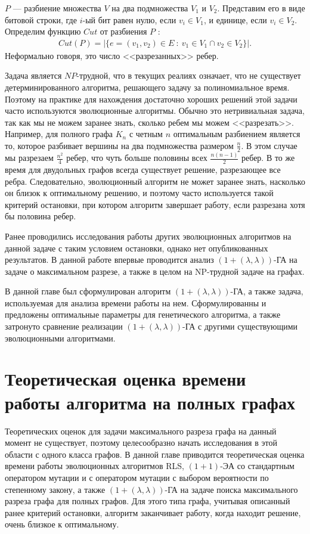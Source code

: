 \documentclass[times]{itmo-student-thesis}
\newcommand{\alglambdaf}{${(1 + (\lambda , \lambda))}$-ГА\xspace}
\newcommand{\oea}{\mbox{$(1 + 1)$-ЭА}\xspace}
\begin{document}
$P$ --- разбиение множества $V$ на два подмножества $V_1$ и $V_2$.
Представим его в виде битовой строки, где $i$-ый бит равен нулю, если $v_i \in V_1$, и единице, если $v_i \in V_2$.
Определим функцию  $Cut$ от разбиения $P$ :
\begin{align*}
   Cut(P) = |\{e = (v_1, v_2) \in E ~:~ v_1 \in V_1 \cap v_2 \in V_2\}|.
\end{align*}
Неформально говоря, это число <<разрезанных>> ребер.

Задача является $NP$-трудной, что в текущих реалиях означает, что не существует детерминированного алгоритма, решающего задачу за полиномиальное время. Поэтому на практике для нахождения достаточно хороших решений этой задачи часто используются эволюционные алгоритмы.
Обычно это нетривиальная задача, так как мы не можем заранее знать, сколько ребем мы можем <<разрезать>>. Например, для полного графа $K_n$ с четным $n$ оптимальным разбиением является то, которое разбивает вершины на два подмножества размером $\frac{n}{2}$. В этом случае мы разрезаем $\frac{n^2}{4}$ ребер, что чуть больше половины всех $\frac{n(n-1)}{2}$ ребер. В то же время для двудольных графов всегда существует решение, разрезающее все ребра. Следовательно, эволюционный алгоритм не может заранее знать, насколько он близок к оптимальному решению, и поэтому часто используется такой критерий остановки, при котором алгоритм завершает работу, если разрезана хотя бы половина ребер.

Ранее проводились исследования работы других эволюционных алгоритмов на данной задаче с таким условием остановки, однако нет опубликованных результатов.
В данной работе впервые проводится анализ \alglambdaf на задаче о максимальном разрезе, а также в целом на NP-трудной задаче на графах.

\chapterconclusion
В данной главе был сформулирован алгоритм \alglambdaf, а также задача, используемая для анализа времени работы на нем. Сформулированны и предложены оптимальные параметры для генетического алгоритма, а также затронуто сравнение реализации \alglambdaf с другими существующими эволюционными алгоритмами.

\chapter{Теоретическая оценка времени работы алгоритма на полных графах}
Теоретических оценок для задачи максимального разреза графа на данный момент не существует, поэтому целесообразно начать исследования в этой области с одного класса графов.
В данной главе приводится теоретическая оценка времени работы эволюционных алгоритмов RLS, \oea со стандартным оператором мутации и с оператором мутации с выбором вероятности по степенному закону, а также \alglambdaf на задаче поиска максимального разреза графа для полных графов.
Для этого типа графа, учитывая описанный ранее критерий остановки, алгоритм заканчивает работу, когда находит решение, очень близкое к оптимальному.
\end{document}
